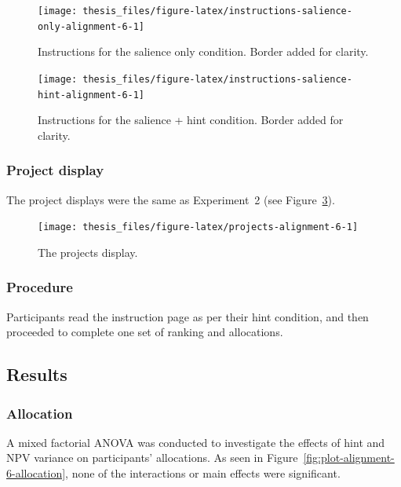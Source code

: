 \documentclass[a4paper, nobind, dvipsnames]{templates/ociamthesis}
\theoremstyle{definition}
\theoremstyle{definition}
\theoremstyle{definition}
\theoremstyle{definition}
\theoremstyle{remark}
\begin{document}
\begin{figure}
\texttt{[image: thesis\_files/figure-latex/instructions-salience-only-alignment-6-1]} \caption{Instructions for the salience only condition. Border added for clarity.}\label{fig:instructions-salience-only-alignment-6}
\end{figure}



\begin{figure}
\texttt{[image: thesis\_files/figure-latex/instructions-salience-hint-alignment-6-1]} \caption{Instructions for the salience + hint condition. Border added for clarity.}\label{fig:instructions-salience-hint-alignment-6}
\end{figure}

\subsubsection{Project display}

The project displays were the same as Experiment~2 (see
Figure~\ref{fig:projects-alignment-6}).



\begin{figure}
\texttt{[image: thesis\_files/figure-latex/projects-alignment-6-1]} \caption{The projects display.}\label{fig:projects-alignment-6}
\end{figure}

\subsubsection{Procedure}

Participants read the instruction page as per their hint condition, and then
proceeded to complete one set of ranking and allocations.

\subsection{Results}

\subsubsection{Allocation}

A mixed factorial ANOVA was conducted to investigate the effects of hint
and NPV variance on participants' allocations. As seen in
Figure~\ref{fig:plot-alignment-6-allocation}, none of the interactions or main
effects were significant.
\end{document}
